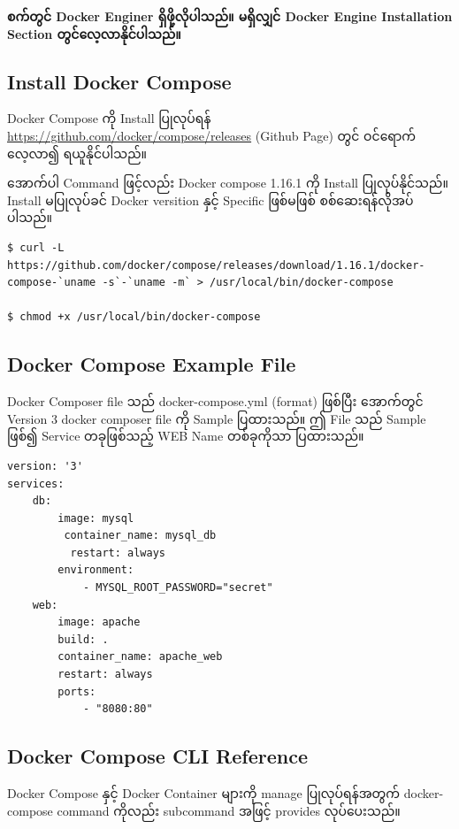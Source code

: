 \textbf{စက်တွင် Docker Enginer ရှိဖို့လိုပါသည်။ မရှိလျှင် Docker Engine
Installation Section တွင်လေ့လာနိုင်ပါသည်။}

\hypertarget{install-docker-compose-1}{%
\subsection{Install Docker Compose}\label{install-docker-compose-1}}

Docker Compose ကို Install ပြုလုပ်ရန်
\url{https://github.com/docker/compose/releases} (Github Page) တွင်
ဝင်ရောက်လေ့လာ၍ ရယူနိုင်ပါသည်။

အောက်ပါ Command ဖြင့်လည်း Docker compose 1.16.1 ကို Install
ပြုလုပ်နိုင်သည်။ Install မပြုလုပ်ခင် Docker versition နှင့် Specific
ဖြစ်မဖြစ် စစ်ဆေးရန်လိုအပ်ပါသည်။

\begin{verbatim}
$ curl -L https://github.com/docker/compose/releases/download/1.16.1/docker-compose-`uname -s`-`uname -m` > /usr/local/bin/docker-compose

$ chmod +x /usr/local/bin/docker-compose
\end{verbatim}

\hypertarget{docker-compose-example-file-1}{%
\subsection{Docker Compose Example
File}\label{docker-compose-example-file-1}}

Docker Composer file သည် docker-compose.yml (format) ဖြစ်ပြီး အောက်တွင်
Version 3 docker composer file ကို Sample ပြထားသည်။ ဤ File သည် Sample
ဖြစ်၍ Service တခုဖြစ်သည့် WEB Name တစ်ခုကိုသာ ပြထားသည်။

\begin{verbatim}
version: '3'
services:
    db:
        image: mysql
         container_name: mysql_db
          restart: always
        environment:
            - MYSQL_ROOT_PASSWORD="secret"
    web:
        image: apache
        build: .
        container_name: apache_web
        restart: always
        ports:
            - "8080:80"
\end{verbatim}

\hypertarget{docker-compose-cli-reference-1}{%
\subsection{Docker Compose CLI
Reference}\label{docker-compose-cli-reference-1}}

Docker Compose နှင့် Docker Container များကို manage ပြုလုပ်ရန်အတွက်
docker-compose command ကိုလည်း subcommand အဖြင့် provides လုပ်ပေးသည်။

